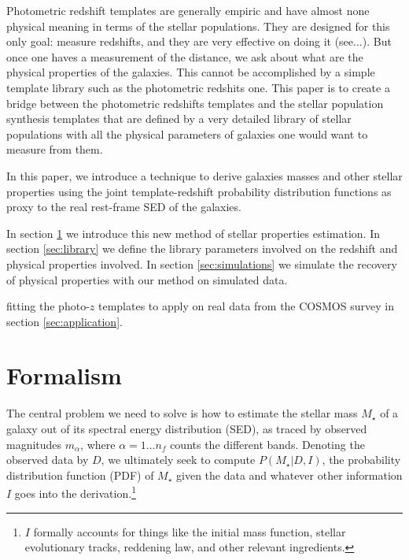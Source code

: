 \documentclass[a4paper, useAMS, usenatbib, hyperpdf]{mn2e}
\begin{document}
Photometric redshift templates are generally empiric and have almost none physical meaning in terms of the stellar populations. They are designed for this only goal: measure redshifts, and they are very effective on doing it (see...). But once one haves a measurement of the distance, we ask about what are the physical properties of the galaxies. This cannot be accomplished by a simple template library such as the photometric redshits one. This paper is to create a bridge between the photometric redshifts templates and the stellar population synthesis templates that are defined by a very detailed library of stellar populations with all the physical parameters of galaxies one would want to measure from them.

In this paper, we introduce a technique to derive galaxies masses and other stellar properties using the joint template-redshift probability distribution functions as proxy to the real rest-frame SED of the galaxies.

In section \ref{sec:method} we introduce this new method of stellar properties estimation. In section \ref{sec:library} we define the library parameters involved on the redshift and physical properties involved. In section \ref{sec:simulations} we simulate the recovery of physical properties with our method on simulated data.

 fitting the photo-$z$ templates to apply on real data from the COSMOS survey in section \ref{sec:application}.







\section{Formalism}
\label{sec:method}



The central problem we need to solve is how to estimate the stellar mass $M_\star$ of a galaxy out of its spectral energy distribution (SED), as traced by observed magnitudes $m_\alpha$, where $\alpha = 1 \ldots n_f$ counts the different bands.
Denoting the observed data by $D$, we ultimately seek to compute  $P(M_\star | D, I)$, the probability distribution function (PDF) of  $M_\star$ given the data and whatever other information $I$ goes into the derivation.\footnote{$I$ formally accounts for things like the initial mass function, stellar evolutionary tracks, reddening law, and other relevant ingredients.}
\end{document}
